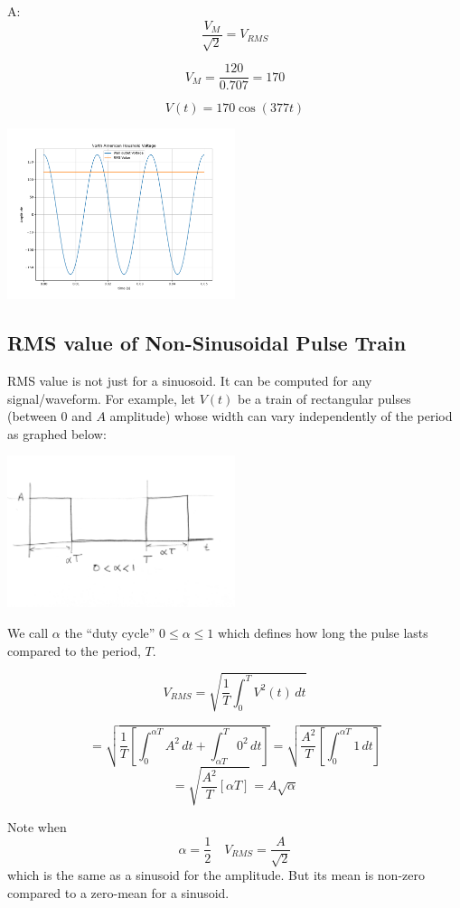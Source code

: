 \noindent A:
\[
\frac{V_M}{\sqrt{2}} = V_{RMS}
\]

\[
V_M = \frac{ 120 } {0.707} = 170
\]

\[
V(t) = 170 \cos(377t)
\]

\includegraphics[width=0.5\textwidth]{figsChapt03/FM67804.png}



\subsection{RMS value of Non-Sinusoidal Pulse Train}
RMS value is not just for a sinuosoid.  It can be computed for any signal/waveform.
For example, let $V(t)$ be a train of rectangular pulses (between 0 and $A$ amplitude)
whose width can vary
independently of the period   as graphed below:


\includegraphics[width=0.5\textwidth]{figsChapt03/HT21139.png}


We call $\alpha $ the ``duty cycle'' \quad $0 \leq \alpha \leq 1$ which defines
how long the pulse lasts compared to the period, $T$.

\[
V_{RMS} = \sqrt{\frac{1}{T} \int_0^T V^2(t) \, dt}
\]

\[
= \sqrt{\frac{1}{T} \left[ \int_0^{\alpha T} A^2 \, dt +  \int_{\alpha T}^T 0^2 \, dt \right]}
= \sqrt{\frac{A^2}{T} [\int_0^{\alpha T} 1 \, dt] }
\]
\[
=\sqrt{\frac{A^2}{T} [ \alpha T] }= A\sqrt{\alpha}
\]

Note when
\[ \alpha = \frac{1}{2} \quad V_{RMS} = \frac{A}{\sqrt{2}}
\]
which is the same as a sinusoid for the amplitude.  But its mean is non-zero
compared to a zero-mean for a sinusoid.








